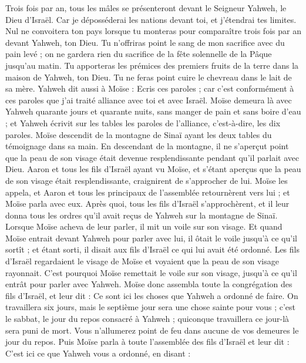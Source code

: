\begin{multicols}{2}
Trois fois par an, tous les mâles se présenteront devant le Seigneur Yahweh, le Dieu d'Israël.
Car je déposséderai les nations devant toi, et j'étendrai tes limites. Nul ne convoitera ton pays lorsque tu monteras pour comparaître trois fois par an devant Yahweh, ton Dieu.
Tu n'offriras point le sang de mon sacrifice avec du pain levé ; on ne gardera rien du sacrifice de la fête solennelle de la Pâque jusqu’au matin.
Tu apporteras les prémices des premiers fruits de la terre dans la maison de Yahweh, ton Dieu. Tu ne feras point cuire le chevreau dans le lait de sa mère.
Yahweh dit aussi à Moïse : Ecris ces paroles ; car c’est conformément à ces paroles que j'ai traité alliance avec toi et avec Israël.
Moïse demeura là avec Yahweh quarante jours et quarante nuits, sans manger de pain et sans boire d'eau ; et Yahweh écrivit sur les tables les paroles de l'alliance, c'est-à-dire, les dix paroles.
Moïse descendit de la montagne de Sinaï ayant les deux tables du témoignage dans sa main. En descendant de la montagne, il ne s'aperçut point que la peau de son visage était devenue resplendissante pendant qu'il parlait avec Dieu.
Aaron et tous les fils d'Israël ayant vu Moïse, et s'étant aperçus que la peau de son visage était resplendissante, craignirent de s’approcher de lui.
Moïse les appela, et Aaron et tous les principaux de l'assemblée retournèrent vers lui ; et Moïse parla avec eux.
Après quoi, tous les fils d'Israël s'approchèrent, et il leur donna tous les ordres qu’il avait reçus de Yahweh sur la montagne de Sinaï.
Lorsque Moïse acheva de leur parler, il mit un voile sur son visage.
Et quand Moïse entrait devant Yahweh pour parler avec lui, il ôtait le voile jusqu’à ce qu'il sortît ; et étant sorti, il disait aux fils d'Israël ce qui lui avait été ordonné.
Les fils d'Israël regardaient le visage de Moïse et voyaient que la peau de son visage rayonnait. C'est pourquoi Moïse remettait le voile sur son visage, jusqu’à ce qu'il entrât pour parler avec Yahweh.
\VerseOne{}Moïse donc assembla toute la congrégation des fils d'Israël, et leur dit : Ce sont ici les choses que Yahweh a ordonné de faire.
On travaillera six jours, mais le septième jour sera une chose sainte pour vous ; c'est le sabbat, le jour du repos consacré à Yahweh ; quiconque travaillera ce jour-là sera puni de mort.
Vous n'allumerez point de feu dans aucune de vos demeures le jour du repos.
Puis Moïse parla à toute l'assemblée des fils d'Israël et leur dit : C'est ici ce que Yahweh vous a ordonné, en disant :

\end{multicols}
